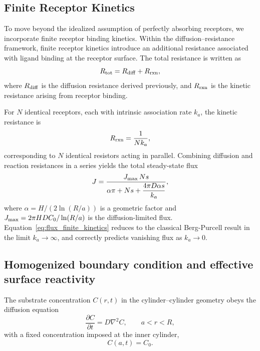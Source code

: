 \subsection{Finite Receptor Kinetics}\label{sec:finite_kinetics}
To move beyond the idealized assumption of perfectly absorbing receptors, we incorporate finite receptor binding kinetics. Within the diffusion--resistance framework, finite receptor kinetics introduce an additional resistance associated with ligand binding at the receptor surface. The total resistance is written as
\begin{equation}
    R_{\mathrm{tot}} = R_{\mathrm{diff}} + R_{\mathrm{rxn}},
    \label{eq:rtot_diff_rxn}
\end{equation}
where $R_{\mathrm{diff}}$ is the diffusion resistance derived previously, and $R_{\mathrm{rxn}}$ is the kinetic resistance arising from receptor binding.

For $N$ identical receptors, each with intrinsic association rate $k_a$, the kinetic resistance is
\begin{equation}
    R_{\mathrm{rxn}} = \frac{1}{N k_a},
    \label{eq:rrxn}
\end{equation}
corresponding to $N$ identical resistors acting in parallel. Combining diffusion and reaction resistances in a series yields the total steady-state flux
\begin{equation}
    J = \frac{J_{\mathrm{max}} \, Ns}{\alpha\pi + Ns + \dfrac{4\pi D \alpha s}{k_a}},
    \label{eq:flux_finite_kinetics}
\end{equation}
where $\alpha = H/(2\ln(R/a))$ is a geometric factor and $J_{\mathrm{max}} = 2\pi H D C_{0}/\ln(R/a)$ is the diffusion-limited flux.
Equation~\eqref{eq:flux_finite_kinetics} reduces to the classical Berg-Purcell result in the limit $k_a \to \infty$, and correctly predicts vanishing flux as $k_a \to 0$.

\subsection{Homogenized boundary condition and effective surface reactivity}\label{sec:homogenized}
The substrate concentration $C(r,t)$ in the cylinder--cylinder geometry obeys the diffusion equation
\begin{equation}
    \frac{\partial C}{\partial t} = D\nabla^{2} C, \qquad a < r < R,
    \label{eq:diffusion_eq}
\end{equation}
with a fixed concentration imposed at the inner cylinder,
\begin{equation}
    C(a,t) = C_{0}.
    \label{eq:inner_bc}
\end{equation}

